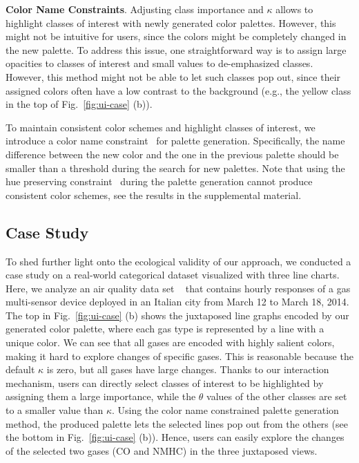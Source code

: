 \vspace{1.5mm}
\noindent\textbf{Color Name Constraints}.
Adjusting class importance and $\kappa$  allows to highlight  classes of interest with newly generated color palettes. However, this might not be intuitive for users, since the colors might be completely changed in the new palette. To address this issue,
one straightforward way is to  assign large opacities  to classes of interest and small values to de-emphasized classes. However, this method might not be able to let such classes pop out, since their assigned colors often have a low contrast to the background (e.g., the yellow class in the top of Fig.~\ref{fig:ui-case} (b)).

To maintain consistent color schemes and highlight classes of interest, we introduce a color name constraint~\cite{heer2012color} for palette generation. Specifically, the name difference between the new color and the one in the previous palette should be smaller than a threshold during the search for new palettes. Note that using the hue preserving constraint~\cite{chuang2009hue} during the palette generation cannot produce consistent color schemes, see the results in the supplemental material.


\subsection{Case Study}
\label{sec:caseStudy}



To shed further light onto the ecological validity of our approach, we conducted a case study on a real-world categorical dataset visualized with three line charts.
Here, we analyze an air quality data set ~\cite{DEVITO2008750} that contains hourly responses of a gas multi-sensor device deployed in an Italian city from March 12 to March 18, 2014.
The top in Fig.~\ref{fig:ui-case} (b) shows the juxtaposed line graphs encoded by our generated color palette, where each gas type is represented by a line with a unique color.
We can see that all gases are encoded with highly salient colors, making it hard to explore changes of specific gases. This is reasonable because the default $\kappa$ is zero, but all gases have large changes.
Thanks to our interaction mechanism, users can directly select classes of interest to be highlighted by assigning them a large importance, while  the $\theta$ values of the other classes are set to a smaller value than $\kappa$. Using the color name constrained palette generation method, the produced palette lets the selected lines pop out from the others (see the bottom in Fig.~\ref{fig:ui-case} (b)). Hence, users can easily explore the changes of the selected two gases (CO and NMHC) in the three juxtaposed views.


